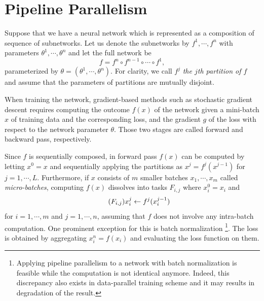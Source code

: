 \section{Pipeline Parallelism}
\label{sec:pipeline-parallelism}

Suppose that we have a neural network which is represented as a composition of sequence of subnetworks. Let us denote the subnetworks by $f^1, \cdots, f^n$ with parameters $\theta^1, \cdots, \theta^n$ and let the full network be 
\[
    f = f^n \circ f^{n-1} \circ \cdots \circ f^1,
\]
parameterized by $\theta = (\theta^1, \cdots, \theta^n)$. For clarity, we call $f^j$ \emph{the $j$th partition of $f$} and assume that the parameters of partitions are mutually disjoint. 

When training the network, gradient-based methods such as stochastic gradient descent requires computing the outcome $f(x)$ of the network given a mini-batch $x$ of training data and the corresponding loss, and the gradient $g$ of the loss with respect to the network parameter $\theta$. Those two stages are called forward and backward pass, respectively. 

Since $f$ is sequentially composed, in forward pass $f(x)$ can be computed by letting $x^0 = x$ and sequentially applying the partitions as $x^j = f^j(x^{j-1})$ for $j=1,\cdots,L$. Furthermore, if $x$ consists of $m$ smaller batches $x_1, \cdots, x_m$ called \emph{micro-batches}, computing $f(x)$ dissolves into tasks $F_{i,j}$ where $x^0_i = x_i$ and 
\begin{equation}
\tag{$F_{i,j}$}
x_i^j \ot f^j(x_i^{j-1})
\end{equation}
for $i=1,\cdots,m$ and $j=1, \cdots, n$, assuming that $f$ does not involve any intra-batch computation. One prominent exception for this is batch normalization \cite{pmlr-v37-ioffe15}\footnote{Applying pipeline parallelism to a network with batch normalization is feasible while the computation is not identical anymore. Indeed, this discrepancy also exists in data-parallel training scheme and it may results in degradation of the result.}. The loss is obtained by aggregating $x_i^n = f(x_i)$ and evaluating the loss function on them.

